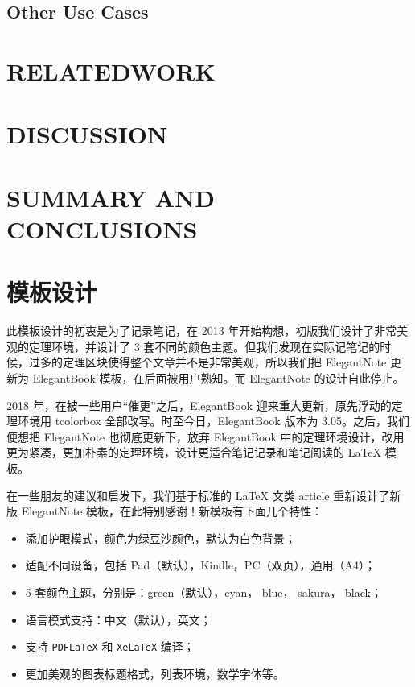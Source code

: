 \documentclass[cn,pad,11pt,green,geye]{../elegantnote}
\begin{document}
\subsection{Other Use Cases}

\section{RELATEDWORK}

\section{DISCUSSION}

\section{SUMMARY AND CONCLUSIONS}


\section{模板设计}
此模板设计的初衷是为了记录笔记，在 2013 年开始构想，初版我们设计了非常美观的定理环境，并设计了 3 套不同的颜色主题。但我们发现在实际记笔记的时候，过多的定理区块使得整个文章并不是非常美观，所以我们把 ElegantNote 更新为 ElegantBook 模板，在后面被用户熟知。而 ElegantNote 的设计自此停止。

2018 年，在被一些用户“催更”之后，ElegantBook 迎来重大更新，原先浮动的定理环境用 tcolorbox 全部改写。时至今日，ElegantBook 版本为 3.05。之后，我们便想把 ElegantNote 也彻底更新下，放弃 ElegantBook 中的定理环境设计，改用更为紧凑，更加朴素的定理环境，设计更适合笔记记录和笔记阅读的 \LaTeX{} 模板。

在一些朋友的建议和启发下，我们基于标准的 \LaTeX{} 文类 article 重新设计了新版 ElegantNote 模板，在此特别感谢！新模板有下面几个特性：
\begin{itemize}
\item 添加护眼模式，颜色为绿豆沙颜色，默认为白色背景；
\item 适配不同设备，包括 Pad（默认），Kindle，PC（双页），通用（A4）；
\item 5 套颜色主题，分别是：\textcolor{egreen}{green}（默认），\textcolor{ecyan}{cyan}， \textcolor{eblue}{blue}， \textcolor{sakura}{sakura}， \textcolor{black}{black}；
\item 语言模式支持：中文（默认），英文；
\item 支持 \lstinline{PDFLaTeX} 和 \lstinline{XeLaTeX} 编译；
\item 更加美观的图表标题格式，列表环境，数学字体等。
\end{itemize}
\end{document}
